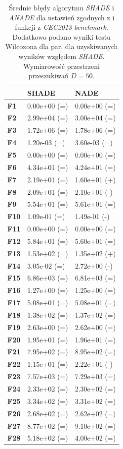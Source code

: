 \documentclass[12pt,a4paper]{report}
\begin{document}
{{{{{{{\begin{table}[h]
\centering
\caption{Średnie błędy algorytmu \emph{SHADE} i \emph{ANADE} dla ustawień zgodnych z \cite{SHADE} i funkcji z \emph{CEC2013 benchmark}. Dodatkowo podano wyniki testu Wilcoxona dla par, dla uzyskiwanych wyników względem \emph{SHADE}. Wymiarowość przestrzeni przeszukiwań $D = 50$.}
\label{FullEksp250}
\begin{tabular}{|l|l|l|}
\hline
          & {\bf SHADE}  & {\bf NADE}   \\ \hline
{\bf F1}  & 0.00e+00 (=) & 0.00e+00 (=) \\ \hline
{\bf F2}  & 2.99e+04 (=) & 3.00e+04 (=) \\ \hline
{\bf F3}  & 1.72e+06 (=) & 1.78e+06 (=) \\ \hline
{\bf F4}  & 1.20e-03 (=) & 3.60e-03 (=) \\ \hline
{\bf F5}  & 0.00e+00 (=) & 0.00e+00 (=) \\ \hline
{\bf F6}  & 4.34e+01 (=) & 4.24e+01 (=) \\ \hline
{\bf F7}  & 2.19e+01 (=) & 1.60e+01 (+) \\ \hline
{\bf F8}  & 2.09e+01 (=) & 2.10e+01 (-) \\ \hline
{\bf F9}  & 5.54e+01 (=) & 5.61e+01 (=) \\ \hline
{\bf F10} & 1.09e-01 (=) & 1.49e-01 (-) \\ \hline
{\bf F11} & 0.00e+00 (=) & 0.00e+00 (=) \\ \hline
{\bf F12} & 5.84e+01 (=) & 5.60e+01 (=) \\ \hline
{\bf F13} & 1.53e+02 (=) & 1.35e+02 (+) \\ \hline
{\bf F14} & 3.05e-02 (=) & 2.72e+00 (-) \\ \hline
{\bf F15} & 6.86e+03 (=) & 6.81e+03 (=) \\ \hline
{\bf F16} & 1.27e+00 (=) & 1.25e+00 (=) \\ \hline
{\bf F17} & 5.08e+01 (=) & 5.08e+01 (=) \\ \hline
{\bf F18} & 1.38e+02 (=) & 1.37e+02 (=) \\ \hline
{\bf F19} & 2.63e+00 (=) & 2.62e+00 (=) \\ \hline
{\bf F20} & 1.95e+01 (=) & 1.96e+01 (=) \\ \hline
{\bf F21} & 7.95e+02 (=) & 8.95e+02 (=) \\ \hline
{\bf F22} & 1.15e+01 (=) & 2.22e+01 (-) \\ \hline
{\bf F23} & 7.57e+03 (=) & 7.29e+03 (=) \\ \hline
{\bf F24} & 2.33e+02 (=) & 2.30e+02 (=) \\ \hline
{\bf F25} & 3.34e+02 (=) & 3.31e+02 (=) \\ \hline
{\bf F26} & 2.68e+02 (=) & 2.62e+02 (=) \\ \hline
{\bf F27} & 8.77e+02 (=) & 9.10e+02 (=) \\ \hline
{\bf F28} & 5.18e+02 (=) & 4.00e+02 (=) \\ \hline
\end{tabular}
\end{table}

}}}}}}}
\end{document}
